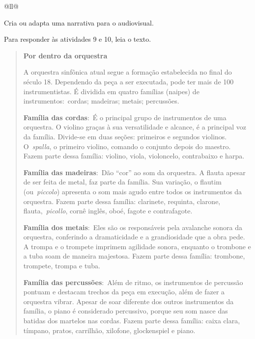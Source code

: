 \begin{itemize}
\begin{itemize}
\begin{escolha}[]{@{}ll@{}}
\begin{boxlist}
\item Cria ou adapta uma narrativa para o audiovisual. 
\end{boxlist}


Para responder às atividades 9 e 10, leia o texto.

\begin{quote}
\textbf{Por dentro da orquestra}

A orquestra sinfônica atual segue a formação
estabelecida no final do século 18. Dependendo da peça a ser executada,
pode ter mais de 100 instrumentistas. É dividida em quatro famílias
(naipes) de instrumentos:~cordas; madeiras; metais; percussões.

\textbf{Família das cordas}:~É o principal grupo de instrumentos de uma
orquestra. O violino graças à sua versatilidade e alcance, é a principal
voz da família. Divide-se em duas seções: primeiros e segundos violinos.
O~\emph{spalla}, o primeiro violino, comando o conjunto depois do
maestro. Fazem parte dessa família: violino, viola, violoncelo,
contrabaixo e harpa.

\textbf{Família das madeiras}:~Dão ``cor'' ao som da orquestra. A flauta
apesar de ser feita de metal, faz parte da família. Sua variação, o
flautim (ou~\emph{piccolo}) apresenta o som mais agudo entre todos os
instrumentos da orquestra. Fazem parte dessa família: clarinete,
requinta, clarone, flauta,~\emph{picollo}, cornê inglês, oboé, fagote e
contrafagote.

\textbf{Família dos metais}:~Eles são os responsáveis pela avalanche
sonora da orquestra, conferindo a dramaticidade e a grandiosidade que a
obra pede. A trompa e o trompete imprimem agilidade sonora, enquanto o
trombone e a tuba soam de maneira majestosa. Fazem parte dessa família:
trombone, trompete, trompa e tuba.

\textbf{Família das percussões}:~Além de ritmo, os instrumentos de
percussão pontuam e destacam trechos da peça em execução, além de fazer
a orquestra vibrar. Apesar de soar diferente dos outros instrumentos da
família, o piano é considerado percussivo, porque seu som nasce das
batidas dos martelos nas cordas. Fazem parte dessa família: caixa clara,
tímpano, pratos, carrilhão, xilofone, glockenspiel e piano.

\end{quote}


\end{escolha}
\end{itemize}
\end{itemize}
